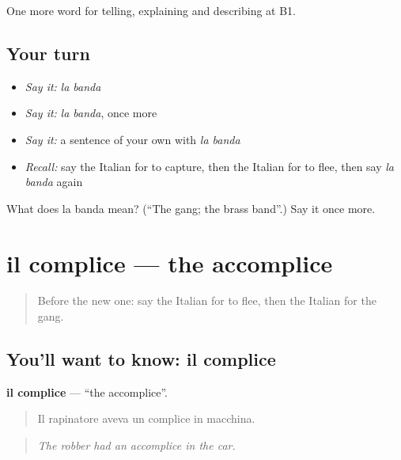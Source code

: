 \begin{grammarlens}[title={What you've built}]
One more word for telling, explaining and describing at B1.
\end{grammarlens}

\subsection*{Your turn}
\begin{itemize}
\raggedright
  \item \emph{Say it:} \emph{la banda}
  \item \emph{Say it:} \emph{la banda}, once more
  \item \emph{Say it:} a sentence of your own with \emph{la banda}
  \item \emph{Recall:} say the Italian for to capture, then the Italian for to flee, then say \emph{la banda} again
\end{itemize}

\begin{tcolorbox}[breakable,colback=teal!4,colframe=teal!35!black,title={Before you move on}]
What does la banda mean? (\textquotedblleft{}The gang; the brass band\textquotedblright{}.) Say it once more.
\end{tcolorbox}
\section[il complice]{il complice — the accomplice}

\label{lesson:IT-C298-complice}



\begin{quote}
Before the new one: say the Italian for to flee, then the Italian for the gang.
\end{quote}

\subsection*{You'll want to know: il complice}
\textbf{il complice} — \textquotedblleft{}the accomplice\textquotedblright{}.

\begin{quote}
Il rapinatore aveva un complice in macchina.
\end{quote}

\begin{quote}
\emph{The robber had an accomplice in the car.}
\end{quote}

